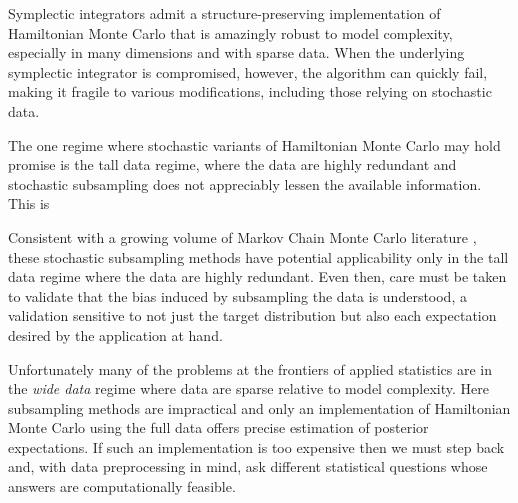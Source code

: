\documentclass{article}
\begin{document}
Symplectic integrators admit a structure-preserving implementation of
Hamiltonian Monte Carlo that is amazingly robust to model complexity,
especially in many dimensions and with sparse data.  When the
underlying symplectic integrator is compromised, however, the algorithm
can quickly fail, making it fragile to various modifications, including those
relying on stochastic data.

The one regime where stochastic variants of Hamiltonian Monte Carlo
may hold promise is the tall data regime, where the data are highly
redundant and stochastic subsampling does not appreciably lessen
the available information.  This is 

Consistent with a growing volume of Markov Chain Monte Carlo literature 
\cite{NeiswangerEtAl:2013, BardenetEtAl:2014}, these stochastic
subsampling methods have potential applicability only in the tall data regime 
where the data are highly redundant.  Even then, care must be taken to 
validate that the bias induced by subsampling the data is understood,
a validation sensitive to not just the target distribution but also each
expectation desired by the application at hand.

Unfortunately many of the problems at the frontiers of applied statistics are 
in the \textit{wide data} regime where data are sparse relative to model 
complexity.  Here subsampling methods are impractical and only an
implementation of Hamiltonian Monte Carlo using the full data offers
precise estimation of posterior expectations.  If such an implementation
is too expensive then we must step back and, with data preprocessing
in mind, ask different statistical questions whose answers are computationally 
feasible.





\end{document}
